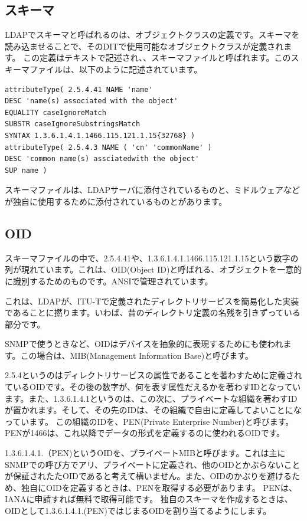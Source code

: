 \subsection{スキーマ}
LDAPでスキーマと呼ばれるのは、オブジェクトクラスの定義です。スキーマを読み込ませることで、そのDITで使用可能なオブジェクトクラスが定義されます。
この定義はテキストで記述され、、スキーマファイルと呼ばれます。このスキーマファイルは、以下のように記述されています。

\begin{verbatim}
attributeType( 2.5.4.41 NAME 'name'
DESC 'name(s) associated with the object'
EQUALITY caseIgnoreMatch
SUBSTR caseIgnoreSubstringsMatch
SYNTAX 1.3.6.1.4.1.1466.115.121.1.15{32768} )
attributeType( 2.5.4.3 NAME ( 'cn' 'commonName' )
DESC 'common name(s) assciatedwith the object'
SUP name )
\end{verbatim}

スキーマファイルは、LDAPサーバに添付されているものと、ミドルウェアなどが独自に使用するために添付されているものとがあります。


\subsection{OID}

スキーマファイルの中で、2.5.4.41や、1.3.6.1.4.1.1466.115.121.1.15という数字の列が現れています。これは、OID(Object ID)と呼ばれる、オブジェクトを一意的に識別するためのものです。ANSIで管理されています。

これは、LDAPが、ITU-Tで定義されたディレクトリサービスを簡易化した実装であることに撚ります。いわば、昔のディレクトリ定義の名残を引きずっている部分です。

SNMPで使うときなど、OIDはデバイスを抽象的に表現するためにも使われます。この場合は、MIB(Management Information Base)と呼びます。

2.5.4というのはディレクトリサービスの属性であることを著わすために定義されているOIDです。その後の数字が、何を表す属性だえるかを著わすIDとなっています。また、1.3.6.1.4.1というのは、この次に、プライベートな組織を著わすIDが置かれます。そして、その先のIDは、その組織で自由に定義してよいことになっています。
この組織のIDを、PEN(Private Enterprise Number)と呼びます。PENが1466は、これ以降でデータの形式を定義するのに使われるOIDです。

1.3.6.1.4.1.（PEN)というOIDを、プライベートMIBと呼びます。これは主にSNMPでの呼び方でアリ、プライベートに定義され、他のOIDとかぶらないことが保証されたたOIDであると考えて構いません。また、OIDのかぶりを避けるため、独自にOIDを定義するときは、PENを取得する必要があります。
PENは、IANAに申請すれば無料で取得可能です。
独自のスキーマを作成するときは、OIDとして1.3.6.1.4.1.(PEN)ではじまるOIDを割り当てるようにします。





